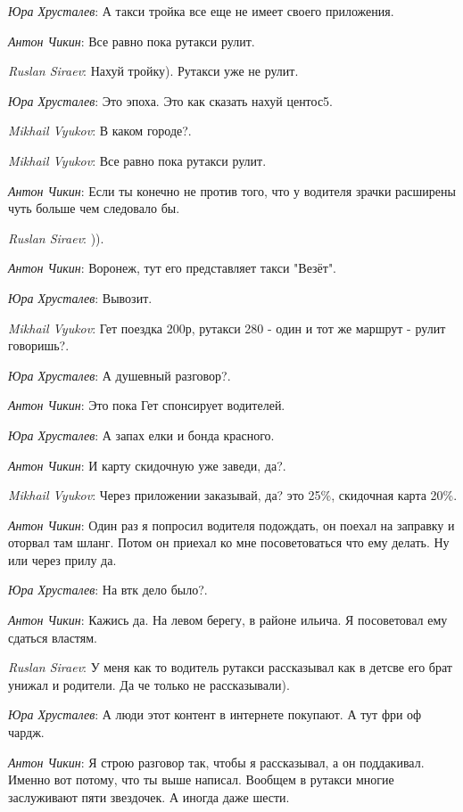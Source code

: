 \documentclass[10pt]{book}
\newcommand{\AUTHOR}[1]{\emph{#1}:}
\begin{document}
\AUTHOR{Юра Хрусталев} А такси тройка все еще не имеет своего приложения.

\AUTHOR{Антон Чикин} Все равно пока рутакси рулит.

\AUTHOR{Ruslan Siraev} Нахуй тройку). Рутакси уже не рулит.

\AUTHOR{Юра Хрусталев} Это эпоха. Это как сказать нахуй центос5.

\AUTHOR{Mikhail Vyukov} В каком городе?.

\AUTHOR{Mikhail Vyukov} Все равно пока рутакси рулит.

\AUTHOR{Антон Чикин} Если ты конечно не против того, что у водителя зрачки расширены чуть больше чем следовало бы.

\AUTHOR{Ruslan Siraev} )).

\AUTHOR{Антон Чикин} Воронеж, тут его представляет такси "Везёт".

\AUTHOR{Юра Хрусталев} Вывозит.

\AUTHOR{Mikhail Vyukov} Гет поездка 200р, рутакси 280 - один и тот же маршрут -  рулит говоришь?.

\AUTHOR{Юра Хрусталев} А душевный разговор?.

\AUTHOR{Антон Чикин} Это пока Гет спонсирует водителей.

\AUTHOR{Юра Хрусталев} А запах елки и бонда красного.

\AUTHOR{Антон Чикин} И карту скидочную уже заведи, да?.

\AUTHOR{Mikhail Vyukov} Через приложении заказывай, да? это 25\%, скидочная карта 20\%.

\AUTHOR{Антон Чикин} Один раз я попросил водителя подождать, он поехал на заправку и оторвал там шланг. Потом он приехал ко мне посоветоваться что ему делать. Ну или через прилу да.

\AUTHOR{Юра Хрусталев} На втк дело было?.

\AUTHOR{Антон Чикин} Кажись да. На левом берегу, в районе ильича. Я посоветовал ему сдаться властям.

\AUTHOR{Ruslan Siraev} У меня как то водитель рутакси рассказывал как в детсве его брат унижал и родители. Да че только не рассказывали).

\AUTHOR{Юра Хрусталев} А люди этот контент в интернете покупают. А тут фри оф чардж.

\AUTHOR{Антон Чикин} Я строю разговор так, чтобы я рассказывал, а он поддакивал. Именно вот потому, что ты выше написал. Вообщем в рутакси многие заслуживают пяти звездочек. А иногда даже шести.
\end{document}
